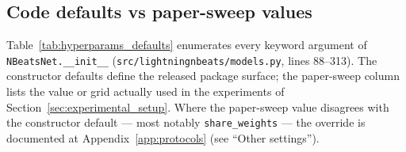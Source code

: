 \documentclass{article}
\begin{document}
\subsection{Code defaults vs paper-sweep values}
\label{app:hyperparams:defaults}

Table~\ref{tab:hyperparams_defaults} enumerates every keyword argument of \texttt{NBeatsNet.\_\_init\_\_} (\texttt{src/lightningnbeats/models.py}, lines 88--313). The constructor defaults define the released package surface; the paper-sweep column lists the value or grid actually used in the experiments of Section~\ref{sec:experimental_setup}. Where the paper-sweep value disagrees with the constructor default --- most notably \texttt{share\_weights} --- the override is documented at Appendix~\ref{app:protocols} (see ``Other settings'').
\end{document}
